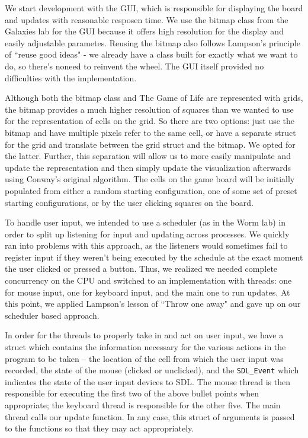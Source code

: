 \documentclass[onecolumn,12pt]{IEEEtran}
\begin{document}
We start development with the GUI, which is responsible for displaying the
board and updates with reasonable resposen time. We use the bitmap class from
the Galaxies lab for the GUI because it offers high resolution for the display
and easily adjustable parametes. Reusing the bitmap also follows Lampson's
principle of ``reuse good ideas" - we already have a class built for exactly
what we want to do, so there's noneed to reinvent the wheel. The GUI itself
provided no difficulties with the implementation. 
	
Although both the bitmap class and The Game of Life are represented with grids,
the bitmap provides a much higher resolution of squares than we wanted to use
for the representation of cells on the grid. So there are two options: just use
the bitmap and have multiple pixels refer to the same cell, or have a separate
struct for the grid and translate between the grid struct and the bitmap. We
opted for the latter. Further, this separation will allow us to more easily
manipulate and update the representation and then simply update the
visualization afterwards using Conway's original algorithm. The cells on the
game board will be initially populated from either a random starting
configuration, one of some set of preset starting configurations, or by the
user clicking squares on the board. 
	
To handle user input, we intended to use a scheduler (as in the Worm lab) in
order to split up listening for input and updating across processes. We quickly
ran into problems with this approach, as the listeners would sometimes fail to
register input if they weren't being executed by the schedule at the exact
moment the user clicked or pressed a button. Thus, we realized we needed
complete concurrency on the CPU and switched to an implementation with threads:
one for mouse input, one for keyboard input, and the main one to run updates.
At this point, we applied Lampson's lesson of ``Throw one away" and gave up on
our scheduler based approach.
	
In order for the threads to properly take in and act on user input, we have a
struct which contains the information necessary for the various actions in the
program to be taken -- the location of the cell from which the user input was
recorded, the state of the mouse (clicked or unclicked), and the
\texttt{SDL\_Event} which indicates the state of the user input devices to SDL.
The mouse thread is then responsible for executing the first two of the above
bullet points when appropriate; the keyboard thread is responsible for the
other five. The main thread calls our update function. In any case, this struct
of arguments is passed to the functions so that they may act appropriately. 
	
\end{document}
